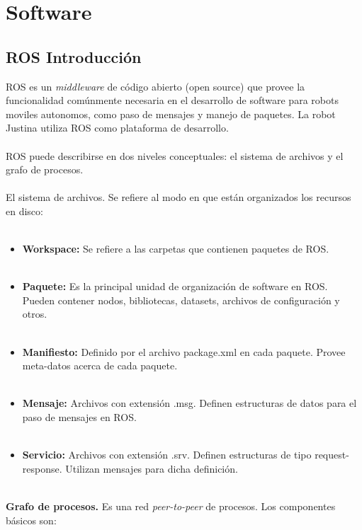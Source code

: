 \documentclass[user_manual.tex]{subfiles}
\begin{document}
 
 \chapter{Software}
\section{ROS Introducción}
ROS es un \textit{middleware} de código abierto (open source) que provee la funcionalidad comúnmente necesaria en el 
desarrollo de software para robots moviles autonomos, como paso de mensajes y manejo de paquetes. La robot Justina 
utiliza ROS como plataforma de desarrollo.\\
\\
ROS puede describirse en dos niveles conceptuales: el sistema de archivos y el grafo de
procesos.\\
\\
El sistema de archivos. Se refiere al modo en que están organizados los recursos en
disco:\\
\\
\begin{itemize}
\item \textbf{Workspace:} Se refiere a las carpetas que contienen paquetes de ROS.\\
\\
\item \textbf{Paquete:} Es la principal unidad de organización de software en ROS. Pueden contener nodos, bibliotecas, datasets,
archivos de configuración y otros.\\
\\
\item \textbf{Manifiesto:} Definido por el archivo package.xml en cada paquete. Provee meta-datos acerca de cada paquete.\\
\\
\item \textbf{Mensaje:} Archivos con extensión .msg. Definen estructuras de datos para el paso de mensajes en ROS.\\
\\
\item \textbf{Servicio:} Archivos con extensión .srv. Definen estructuras de tipo request-response. Utilizan mensajes para dicha definición.\\
\\
\end{itemize}
\textbf{Grafo de procesos.} Es una red \textit{peer-to-peer} de procesos. Los componentes básicos son:\\
\\
\end{document}

